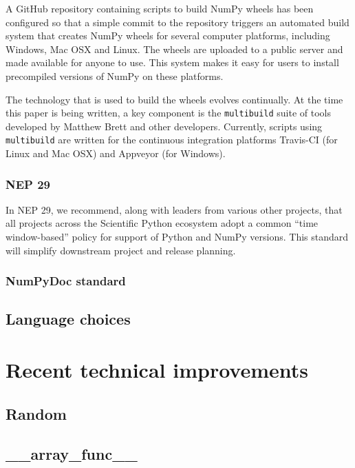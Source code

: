 \documentclass[fleqn,10pt]{wlscirep}
\newcommand{\code}[1]{\texttt{#1}}
\begin{document}
A GitHub repository containing scripts to build NumPy wheels has
been configured so that a simple commit to the repository triggers
an automated build system that creates NumPy wheels for several
computer platforms, including Windows, Mac OSX and Linux.  The wheels
are uploaded to a public server and made available for anyone to use.
This system makes it easy for users to install precompiled versions
of NumPy on these platforms.

The technology that is used to build the wheels evolves continually.
At the time this paper is being written, a key component is the
\code{multibuild} suite of tools developed by Matthew Brett and
other developers\cite{multibuild}.  Currently, scripts using
\code{multibuild} are written for the continuous integration
platforms Travis-CI (for Linux and Mac OSX) and Appveyor
(for Windows).


\subsubsection*{NEP 29}

In NEP 29, we recommend, along with leaders from various other
projects, that all projects across the Scientific Python ecosystem
adopt a common ``time window-based'' policy for support of Python and
NumPy versions. This standard will simplify downstream project and
release planning.

\subsubsection*{NumPyDoc standard}


\subsection*{Language choices}

\section*{Recent technical improvements}

\subsection*{Random}

\subsection*{\_\_array\_func\_\_}
\end{document}
